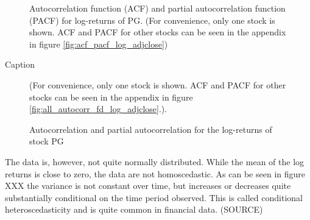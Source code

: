 \begin{figure}[h]
    \centering
    \begin{adjustbox}{width=.9\textwidth,center}
    
    \end{adjustbox}  
    \caption{Autocorrelation function (ACF) and partial autocorrelation function (PACF) for log-returns of PG. (For convenience, only one stock is shown. ACF and PACF for other stocks can be seen in the appendix in figure \ref{fig:acf_pacf_log_adjclose})}
    \label{fig:acf_pacf_log_adjclose_PG}
\end{figure}{}

\begin{table}[h!]
    \centering
    \begin{adjustbox}{width = \linewidth}
    
    \end{adjustbox}
    \caption{Caption}
    \label{tab:log return means}
\end{table}{}

\begin{figure}[H]
    \centering
    \begin{adjustbox}{width=.9\textwidth,center}
    
    \end{adjustbox}  
    \caption{Autocorrelation and partial autocorrelation for the log-returns of stock PG} (For convenience, only one stock is shown. ACF and PACF for other stocks can be seen in the appendix in figure \ref{fig:all_autocorr_fd_log_adjclose}.). 
    \label{fig:PG_autocorr_fd_log_adjclose}
\end{figure}{}








The data is, however, not quite normally distributed. While the mean of the log returns is close to zero, the data are not homoscedastic. As can be seen in figure XXX the variance is not constant over time, but increases or decreases quite substantially conditional on the time period observed. This is called conditional heteroscedasticity and is quite common in financial data. (SOURCE)



